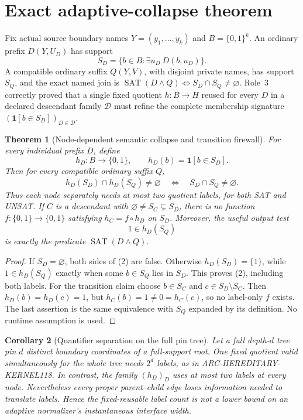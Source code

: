 \documentclass[11pt]{article}
\newtheorem{theorem}{Theorem}
\newtheorem{corollary}[theorem]{Corollary}
\newcommand{\SAT}{\operatorname{SAT}}
\begin{document}
\section{Exact adaptive-collapse theorem}
Fix actual source boundary names $Y=(y_1,\ldots,y_k)$ and
$B=\{0,1\}^k$.  An ordinary prefix $D(Y,U_D)$ has support
\[
 S_D=\{b\in B:\exists u_D\ D(b,u_D)\}.
\]
A compatible ordinary suffix $Q(Y,V)$, with disjoint private names, has
support $S_Q$, and the exact named join is
$\SAT(D\wedge Q)\iff S_D\cap S_Q\ne\varnothing$.
Role~3 correctly proved that a single fixed quotient $h:B\to H$ reused for
every $D$ in a declared descendant family $\mathcal D$ must refine the
complete membership signature
$(\mathbf1[b\in S_D])_{D\in\mathcal D}$.

\begin{theorem}[Node-dependent semantic collapse and transition firewall]
For every individual prefix $D$, define
\[
 h_D:B\to\{0,1\},\qquad h_D(b)=\mathbf1[b\in S_D].        \tag{1}
\]
Then for every compatible ordinary suffix $Q$,
\[
 h_D(S_D)\cap h_D(S_Q)\ne\varnothing
 \quad\Longleftrightarrow\quad
 S_D\cap S_Q\ne\varnothing.                              \tag{2}
\]
Thus each node separately needs at most two quotient labels, for both SAT
and UNSAT.  If $C$ is a descendant with
$\varnothing\ne S_C\subsetneq S_D$, there is no function
$f:\{0,1\}\to\{0,1\}$ satisfying $h_C=f\circ h_D$ on $S_D$.
Moreover, the useful output test
\[
 1\in h_D(S_Q)                                             \tag{3}
\]
is exactly the predicate $\SAT(D\wedge Q)$.
\end{theorem}
\begin{proof}
If $S_D=\varnothing$, both sides of (2) are false.  Otherwise
$h_D(S_D)=\{1\}$, while $1\in h_D(S_Q)$ exactly when some
$b\in S_Q$ lies in $S_D$.  This proves (2), including both labels.
For the transition claim choose $b\in S_C$ and
$c\in S_D\setminus S_C$.  Then $h_D(b)=h_D(c)=1$, but
$h_C(b)=1\ne0=h_C(c)$, so no label-only $f$ exists.
The last assertion is the same equivalence with $S_Q$ expanded by its
definition.  No runtime assumption is used.
\end{proof}

\begin{corollary}[Quantifier separation on the full pin tree]
Let a full depth-$d$ tree pin $d$ distinct boundary coordinates of a
full-support root.  One fixed quotient valid simultaneously for the whole
tree needs $2^d$ labels, as in ARC-HEREDITARY-KERNEL118.  In contrast, the
family $(h_D)_D$ uses at most two labels at every node.  Nevertheless every
proper parent--child edge loses information needed to translate labels.
Hence the fixed-reusable label count is not a lower bound on an adaptive
normalizer's instantaneous interface width.
\end{corollary}
\end{document}

